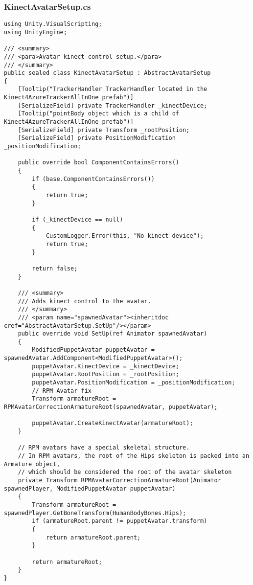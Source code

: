 \subsubsection*{KinectAvatarSetup.cs}
\begin{verbatim}
using Unity.VisualScripting;
using UnityEngine;

/// <summary>
/// <para>Avatar kinect control setup.</para>
/// </summary>
public sealed class KinectAvatarSetup : AbstractAvatarSetup
{
    [Tooltip("TrackerHandler TrackerHandler located in the Kinect4AzureTrackerAllInOne prefab")]
    [SerializeField] private TrackerHandler _kinectDevice;
    [Tooltip("pointBody object which is a child of Kinect4AzureTrackerAllInOne prefab")]
    [SerializeField] private Transform _rootPosition;
    [SerializeField] private PositionModification _positionModification;
    
    public override bool ComponentContainsErrors()
    {
        if (base.ComponentContainsErrors())
        {
            return true;
        }

        if (_kinectDevice == null)
        {
            CustomLogger.Error(this, "No kinect device");
            return true;
        }

        return false;
    }

    /// <summary>
    /// Adds kinect control to the avatar.
    /// </summary>
    /// <param name="spawnedAvatar"><inheritdoc cref="AbstractAvatarSetup.SetUp"/></param>
    public override void SetUp(ref Animator spawnedAvatar)
    {
        ModifiedPuppetAvatar puppetAvatar = spawnedAvatar.AddComponent<ModifiedPuppetAvatar>();
        puppetAvatar.KinectDevice = _kinectDevice;
        puppetAvatar.RootPosition = _rootPosition;
        puppetAvatar.PositionModification = _positionModification;
        // RPM Avatar fix
        Transform armatureRoot = RPMAvatarCorrectionArmatureRoot(spawnedAvatar, puppetAvatar);

        puppetAvatar.CreateKinectAvatar(armatureRoot);
    }

    // RPM avatars have a special skeletal structure.
    // In RPM avatars, the root of the Hips skeleton is packed into an Armature object,
    // which should be considered the root of the avatar skeleton
    private Transform RPMAvatarCorrectionArmatureRoot(Animator spawnedPlayer, ModifiedPuppetAvatar puppetAvatar)
    {
        Transform armatureRoot = spawnedPlayer.GetBoneTransform(HumanBodyBones.Hips);
        if (armatureRoot.parent != puppetAvatar.transform)
        {
            return armatureRoot.parent;
        }

        return armatureRoot;
    }
}
\end{verbatim}
